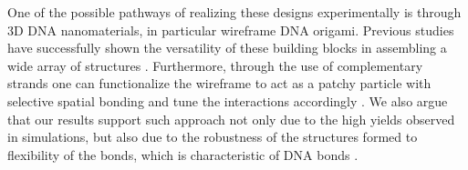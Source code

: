 \documentclass[a4paper, amsfonts, amssymb, amsmath, reprint, showkeys, nofootinbib, oneside]{revtex4-1}
\begin{document}
One of the possible pathways of realizing these designs experimentally is through 3D DNA nanomaterials, in particular wireframe DNA origami. Previous studies have successfully shown the versatility of these building blocks in assembling a wide array of structures \cite{Mosayebi2017, Lee2022, Jun2021, Rothemund2006}. Furthermore, through the use of complementary strands one can functionalize the wireframe to act as a patchy particle with selective spatial bonding and tune the interactions accordingly \cite{Biancaniello2005, Wang2015}. We also argue that our results support such approach not only due to the high yields observed in simulations, but also due to the robustness of the structures formed to flexibility of the bonds, which is characteristic of DNA bonds \cite{Meulen2015, Meulen2015, Geerts2010}.


\end{document}
